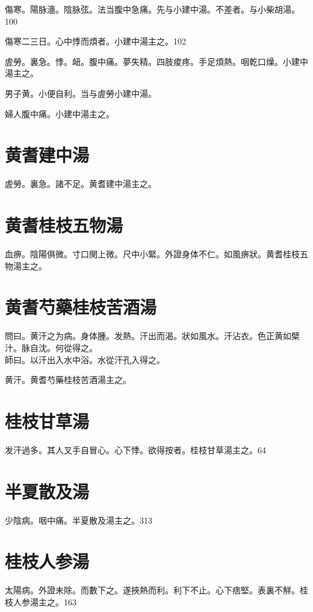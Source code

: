 \documentclass[12pt,twoside,UTF8,b5paper]{ctexbook}
\begin{document}
傷寒。陽脉濇。陰脉弦。法当腹中急痛。先与小建中湯。不差者。与小柴胡湯。100

傷寒二三日。心中悸而煩者。小建中湯主之。102

虗勞。裏急。悸。衄。腹中痛。夢失精。四肢痠疼。手足煩熱。咽乾口燥。小建中湯主之。

男子黄。小便自利。当与虗勞小建中湯。

婦人腹中痛。小建中湯主之。

\section{黄耆建中湯}

虗勞。裏急。諸不足。黄耆建中湯主之。

\section{黄耆桂枝五物湯}

血痹。陰陽俱微。寸口関上微。尺中小緊。外證身体不仁。如風痹狀。黄耆桂枝五物湯主之。

\section{黄耆芍藥桂枝苦酒湯}

問曰。黄汗之为病。身体腫。发熱。汗出而渴。狀如風水。汗沾衣。色正黄如檗汁。脉自沈。何從得之。\\
師曰。以汗出入水中浴。水從汗孔入得之。

黄汗。黄耆芍藥桂枝苦酒湯主之。

\section{桂枝甘草湯}

发汗過多。其人叉手自冒心。心下悸。欲得按者。桂枝甘草湯主之。64

\section{半夏散及湯}

少陰病。咽中痛。半夏散及湯主之。313

\section{桂枝人参湯}

太陽病。外證未除。而數下之。遂挾熱而利。利下不止。心下痞堅。表裏不觧。桂枝人参湯主之。163
\end{document}
